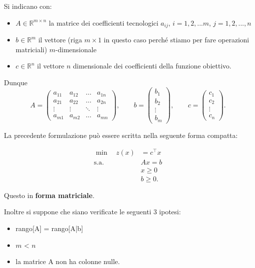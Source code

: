 Si indicano con:
\begin{itemize}
    \item $A \in \mathbb{R}^ {m \times n}$ la matrice dei coefficienti tecnologici $a_{ij}$, $i = 1,2,...m$, $j = 1,2,...,n$
    \item $b \in \mathbb{R}^m$ il vettore (riga $m \times 1$ in questo caso perché stiamo per fare operazioni matriciali) $m$-dimensionale
    \item $c \in \mathbb{R}^n$ il vettore $n$ dimensionale dei coefficienti della funzione obiettivo.
\end{itemize}
Dunque
\[
A =
\begin{pmatrix}
a_{11} & a_{12} & \dots & a_{1n} \\
a_{21} & a_{22} & \dots & a_{2n} \\
\vdots & \vdots & \ddots & \vdots \\
a_{m1} & a_{m2} & \dots & a_{mn}
\end{pmatrix},
\qquad
b =
\begin{pmatrix}
b_1 \\
b_2 \\
\vdots \\
b_m
\end{pmatrix},
\qquad
c =
\begin{pmatrix}
c_1 \\
c_2 \\
\vdots \\
c_n
\end{pmatrix}.
\]

La precedente formulazione può essere scritta nella seguente forma compatta:

\begin{align*}
\min \quad z(x) &= c^\top x \\
\text{s.a.}\quad & Ax = b \\
& x \geq 0 \\
& b \geq 0.
\end{align*}

Questo in \textbf{forma matriciale}.



Inoltre si suppone che siano verificate le seguenti 3 ipotesi:
\begin{itemize}
    \item rango[A] = rango[A|b]
    \item $m$ < $n$
    \item la matrice A non ha colonne nulle.
\end{itemize}



